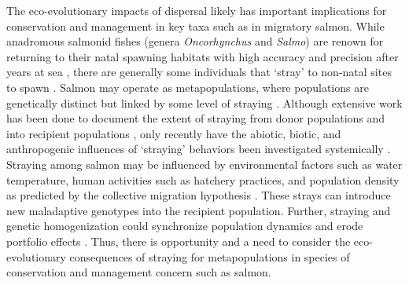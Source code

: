 \documentclass[twocolumn,preprintnumbers,amsmath,amssymb,superscriptaddress]{revtex4}
\begin{document}
The eco-evolutionary impacts of dispersal likely has important implications for conservation and management in key taxa such as in migratory salmon.
While anadromous salmonid fishes (genera \emph{Oncorhynchus} and \emph{Salmo}) are renown for returning to their natal spawning habitats with high accuracy and precision after years at sea \cite{Quinn:2011tf,Jonsson:2011kg,Keefer:2014gg}, there are generally some individuals that `stray' to non-natal sites to spawn \cite{Quinn:1993ge,Hendry:2004wf}.
Salmon may operate as metapopulations, where populations are genetically distinct but linked by some level of straying \cite{Schtickzelle:2007wb,Anderson:2014cx}.
Although extensive work has been done to document the extent of straying from donor populations and into recipient populations \cite{Keefer:2014gg,Bett:2017ha}, only recently have the abiotic, biotic, and anthropogenic influences of `straying' behaviors been investigated systemically \cite{Keefer:2008bs,Westley:2015to,Bond:2016dz}.
Straying among salmon may be influenced by environmental factors such as water temperature, human activities such as hatchery practices, and population density as predicted by the collective migration hypothesis \cite{Peterson:2014gy}.
These strays can introduce new maladaptive genotypes into the recipient population.
Further, straying and genetic homogenization could synchronize population dynamics and erode portfolio effects \cite{Moore:2010gs,Carlson:2011ce,Braun:2016ib}.
Thus, there is opportunity and a need to consider the eco-evolutionary consequences of straying for metapopulations in species of conservation and management concern such as salmon. 

\end{document}
